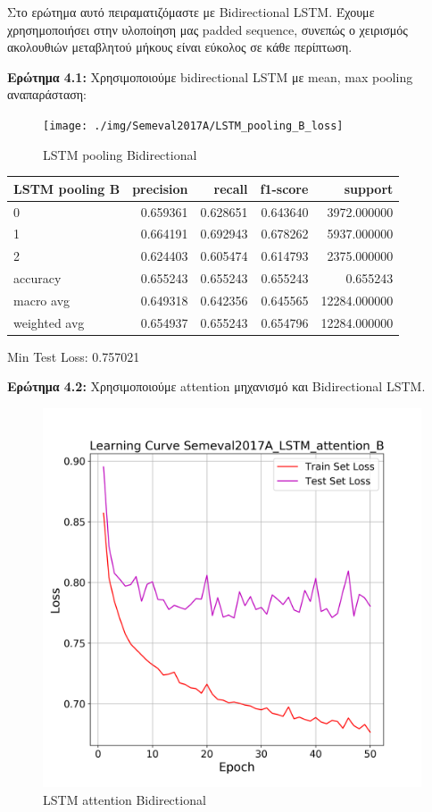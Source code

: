 \documentclass[12pt]{article}
\begin{document}
Στο ερώτημα αυτό πειραματιζόμαστε με Bidirectional LSTM. Έχουμε χρησημοποιήσει στην υλοποίηση μας padded sequence, συνεπώς ο χειρισμός ακολουθιών μεταβλητού μήκους είναι εύκολος σε κάθε περίπτωση.

\textbf{Ερώτημα 4.1:}
Χρησιμοποιούμε bidirectional LSTM με mean, max pooling αναπαράσταση:

\begin{figure}[h!]
	\centering
	\texttt{[image: ./img/Semeval2017A/LSTM\_pooling\_Β\_loss]}
	\caption{LSTM pooling Bidirectional}
	\label{fig:sin}
\end{figure}


\begin{tabular}{lrrrr}
\toprule
LSTM pooling B &  precision &    recall &  f1-score &   support \\
\midrule
0            &   0.659361 &  0.628651 &  0.643640 &   3972.000000 \\
1            &   0.664191 &  0.692943 &  0.678262 &   5937.000000 \\
2            &   0.624403 &  0.605474 &  0.614793 &   2375.000000 \\
accuracy     &   0.655243 &  0.655243 &  0.655243 &      0.655243 \\
macro avg    &   0.649318 &  0.642356 &  0.645565 &  12284.000000 \\
weighted avg &   0.654937 &  0.655243 &  0.654796 &  12284.000000 \\
\bottomrule
\end{tabular}

Min Test Loss: 0.757021


\textbf{Ερώτημα 4.2:}
Χρησιμοποιούμε attention μηχανισμό και Bidirectional LSTM.

\begin{figure}[h]
	\centering
	\includegraphics[width=0.6\linewidth]{./img/Semeval2017A/LSTM_attention_B_loss}
	\caption{LSTM attention Bidirectional}
	\label{fig:sin}
\end{figure}
\end{document}
